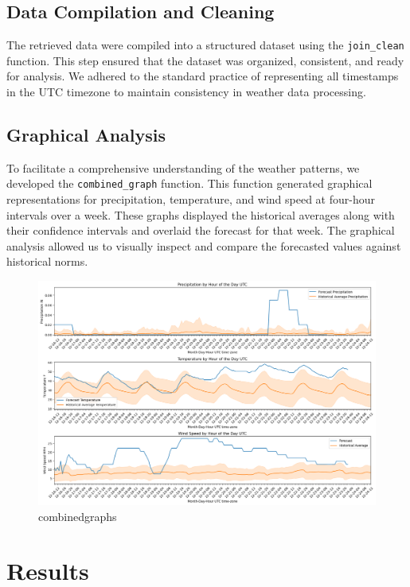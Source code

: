 \documentclass[conference]{IEEEtran}
\begin{document}
\subsection{Data Compilation and Cleaning}
    The retrieved data were compiled into a structured dataset using the \texttt{join\_clean} function. This step ensured that the dataset was organized, consistent, and ready for analysis. We adhered to the standard practice of representing all timestamps in the UTC timezone to maintain consistency in weather data processing.

\subsection{Graphical Analysis}
    To facilitate a comprehensive understanding of the weather patterns, we developed the \texttt{combined\_graph} function. This function generated graphical representations for precipitation, temperature, and wind speed at four-hour intervals over a week. These graphs displayed the historical averages along with their confidence intervals and overlaid the forecast for that week. The graphical analysis allowed us to visually inspect and compare the forecasted values against historical norms.




\begin{figure}[htbp]
    \centering
    \includegraphics[width=\textwidth]{example_graph.png}
    \caption{combined\textunderscore graphs}
    \label{fig:combined_graphs (Kansas City)}
\end{figure}

\section{Results}
\end{document}
